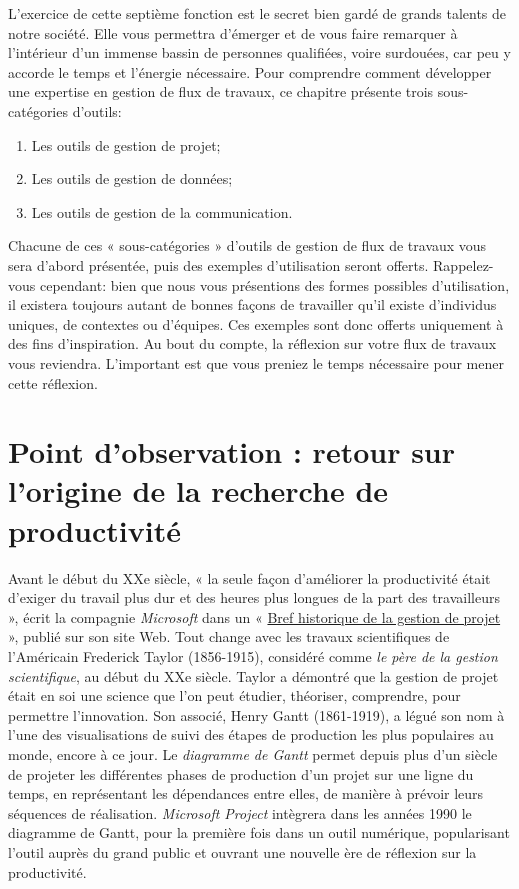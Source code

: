 \documentclass[
  letterpaper,
  DIV=11,
  numbers=noendperiod]{scrreprt}
\providecommand{\tightlist}{%
  \setlength{\itemsep}{0pt}\setlength{\parskip}{0pt}}\usepackage{longtable,booktabs,array}
\begin{document}
L'exercice de cette septième fonction est le secret bien gardé de grands
talents de notre société. Elle vous permettra d'émerger et de vous faire
remarquer à l'intérieur d'un immense bassin de personnes qualifiées,
voire surdouées, car peu y accorde le temps et l'énergie nécessaire.
Pour comprendre comment développer une expertise en gestion de flux de
travaux, ce chapitre présente trois sous-catégories d'outils:

\begin{enumerate}
\def\labelenumi{\arabic{enumi}.}
\tightlist
\item
  Les outils de gestion de projet;
\item
  Les outils de gestion de données;
\item
  Les outils de gestion de la communication.
\end{enumerate}

Chacune de ces « sous-catégories » d'outils de gestion de flux de
travaux vous sera d'abord présentée, puis des exemples d'utilisation
seront offerts. Rappelez-vous cependant: bien que nous vous présentions
des formes possibles d'utilisation, il existera toujours autant de
bonnes façons de travailler qu'il existe d'individus uniques, de
contextes ou d'équipes. Ces exemples sont donc offerts uniquement à des
fins d'inspiration. Au bout du compte, la réflexion sur votre flux de
travaux vous reviendra. L'important est que vous preniez le temps
nécessaire pour mener cette réflexion.

\hypertarget{point-dobservation-retour-sur-lorigine-de-la-recherche-de-productivituxe9}{%
\section{Point d'observation : retour sur l'origine de la recherche de
productivité}\label{point-dobservation-retour-sur-lorigine-de-la-recherche-de-productivituxe9}}

Avant le début du XXe siècle, « la seule façon d'améliorer la
productivité était d'exiger du travail plus dur et des heures plus
longues de la part des travailleurs », écrit la compagnie
\emph{Microsoft} dans un «
\href{https://support.microsoft.com/fr-fr/topic/bref-historique-de-la-gestion-de-projet-a2e0b717-094b-4d1e-878a-fcd0978891cd}{Bref
historique de la gestion de projet} », publié sur son site Web. Tout
change avec les travaux scientifiques de l'Américain Frederick Taylor
(1856-1915), considéré comme \emph{le père de la gestion scientifique},
au début du XXe siècle. Taylor a démontré que la gestion de projet était
en soi une science que l'on peut étudier, théoriser, comprendre, pour
permettre l'innovation. Son associé, Henry Gantt (1861-1919), a légué
son nom à l'une des visualisations de suivi des étapes de production les
plus populaires au monde, encore à ce jour. Le \emph{diagramme de Gantt}
permet depuis plus d'un siècle de projeter les différentes phases de
production d'un projet sur une ligne du temps, en représentant les
dépendances entre elles, de manière à prévoir leurs séquences de
réalisation. \emph{Microsoft Project} intègrera dans les années 1990 le
diagramme de Gantt, pour la première fois dans un outil numérique,
popularisant l'outil auprès du grand public et ouvrant une nouvelle ère
de réflexion sur la productivité.
\end{document}

